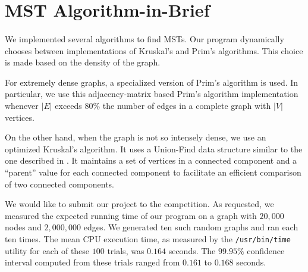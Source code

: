 \section{MST Algorithm-in-Brief}
\label{sec:algbrief}

\paragraph{}
We implemented several algorithms to find MSTs.  Our program dynamically chooses
between implementations of Kruskal's and Prim's algorithms.  This choice is made
based on the density of the graph.

For extremely dense graphs, a specialized version of Prim's algorithm is used.
In particular, we use this adjacency-matrix based Prim's algorithm
implementation whenever $|E|$ exceeds $80$\% the number of edges in a complete
graph with $|V|$ vertices.

On the other hand, when the graph is not so intensely dense, we use an optimized
Kruskal's algorithm.  It uses a Union-Find data structure similar to the one
described in \cite{algdesign}.  It maintains a set of vertices in a connected
component and a ``parent'' value for each connected component to facilitate an
efficient comparison of two connected components.

We would like to submit our project to the competition. As requested, we
measured the expected running time of our program on a graph with $20,000$ nodes
and $2,000,000$ edges.  We generated ten such random graphs and ran each ten
times.  The mean CPU execution time, as measured by the \texttt{/usr/bin/time}
utility for each of these $100$ trials, was $0.164$ seconds.  The $99.95\%$
confidence interval computed from these trials ranged from $0.161$ to $0.168$
seconds.
